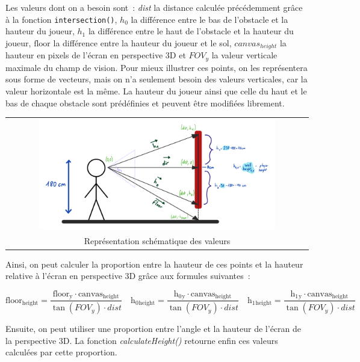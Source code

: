 \documentclass[11pt,french,a4paper,]{article}
\begin{document}
Les valeurs dont on a besoin sont~: \emph{dist} la distance calculée
précédemment grâce à la fonction \texttt{intersection()}, \(h_0\) la
différence entre le bas de l'obstacle et la hauteur du joueur, \(h_1\)
la différence entre le haut de l'obstacle et la hauteur du joueur,
\(\mathrm{floor}\) la différence entre la hauteur du joueur et le sol,
\(canvas_{height}\) la hauteur en pixels de l'écran en perspective 3D et
\(FOV_y\) la valeur verticale maximale du champ de vision. Pour mieux
illustrer ces points, on les représentera sous forme de vecteurs, mais
on n'a seulement besoin des valeurs verticales, car la valeur
horizontale est la même. La hauteur du joueur ainsi que celle du haut et
le bas de chaque obstacle sont prédéfinies et peuvent être modifiées
librement.

\begin{longtable}[]{@{}c@{}}
\toprule
\endhead
\includegraphics[width=0.8\textwidth,height=\textheight]{../img/Drawings/new_vertical_raycast_drawing.png}\tabularnewline
Représentation schématique des valeurs\tabularnewline
\bottomrule
\end{longtable}

Ainsi, on peut calculer la proportion entre la hauteur de ces points et
la hauteur relative à l'écran en perspective 3D grâce aux formules
suivantes~:

\[
\mathrm{floor{_{height}}} = \frac{\mathrm{floor{_y}\cdot \mathrm{canvas_{height}}}}
                                 {\tan{(FOV_y)} \cdot dist} \quad
\mathrm{h_0{_{height}}} = \frac{\mathrm{h_0{_y} \cdot \mathrm{canvas_{height}}}}
                               {\tan{(FOV_y)} \cdot dist} \quad
\mathrm{h_1{_{height}}} = \frac{\mathrm{h_1{_y} \cdot \mathrm{canvas_{height}}}}
                               {\tan{(FOV_y)} \cdot dist}
\]

Ensuite, on peut utiliser une proportion entre l'angle et la hauteur de
l'écran de la perspective 3D. La fonction \emph{calculateHeight()}
retourne enfin ces valeurs calculées par cette proportion.
\end{document}
